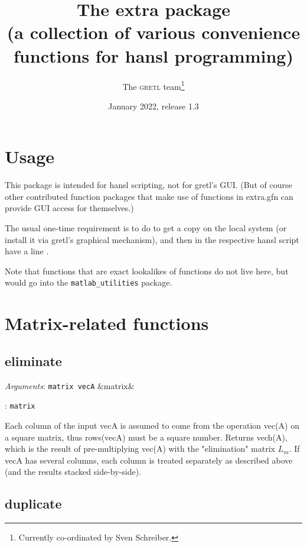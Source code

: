 \documentclass[11pt,english]{article}
\newcommand{\noun}[1]{\textsc{#1}}
\newcommand{\ArgRet}[2]{%
  {\it Arguments}: {#1}%
  \ifx&#2&%
  \else
  \par\smallskip\noindent {\it Return type}: \texttt{#2}
  \fi%
  \par\medskip\par%
  }
\begin{document}
\title{The extra package\\
(a collection of various convenience functions for hansl programming) }

\date{January 2022, release 1.3}

\author{The \noun{gretl} team\thanks{Currently co-ordinated by Sven Schreiber.}}

\maketitle
\tableofcontents{}

\section{Usage}

This package is intended for hansl scripting, not for gretl's GUI.
(But of course other contributed function packages that make use of
functions in extra.gfn can provide GUI access for themselves.)

The usual one-time requirement is to do 
to get a copy on the local system (or install it via gretl's graphical
mechanism), and then in the respective hansl script have a line .

Note that functions that are exact lookalikes of 
functions do not live here, but would go into the
\texttt{matlab\_utilities} package.


\section{Matrix-related functions}

\subsection{eliminate}

\ArgRet{\texttt{matrix vecA}}{matrix}

Each column of the input vecA is assumed to come from the operation vec(A)
on a square matrix, thus rows(vecA) must be a square number.
Returns vech(A), which is the result of pre-multiplying vec(A) with the
"elimination" matrix $L_m$.
If vecA has several columns, each column is
treated separately as described above (and the results stacked side-by-side).

\subsection{duplicate}
\end{document}
